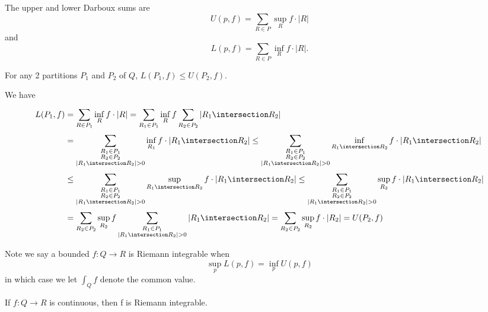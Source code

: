 \vline

\begin{definition}
	The upper and lower Darboux sums are
	\[
		U(p,f) = \sum_{R \in P} \sup_R f \cdot |R|
	\]
	and
	\[
		L(p,f) = \sum_{R \in P} \inf_R f \cdot |R|.
	\]
\end{definition}

\begin{lemma}
	For any 2 partitions $P_1$ and $P_2$ of $Q$, $L(P_1,f) \leq U(P_2, f)$.
\end{lemma}

\begin{solution}
	We have
	\begin{align*}
		L(P_1, f) &= \sum_{R \in P_1}^{}  \inf_{R} f \cdot |R| = \sum_{R_1 \in P_1}^{} \inf_{R} f
		\sum_{R_2 \in P_2}^{} |R_1 \intersection R_2 | \\
				  &= \sum_{\substack{R_1 \in P_1 \\ R_2 \in P_2 \\ |R_1 \intersection R_2 | > 0} }^{} \inf_{R_1} f \cdot |R_1 \intersection R_2 |
				  \leq \sum_{\substack{R_1 \in P_1 \\ R_2 \in P_2 \\ |R_1 \intersection R_2 | > 0} }^{} \inf_{R_1 \intersection R_2} f \cdot |R_1 \intersection R_2 | \\
				  &\leq \sum_{\substack{R_1 \in P_1 \\ R_2 \in P_2 \\ |R_1 \intersection R_2 | > 0} }^{} \sup_{R_1 \intersection R_2} f \cdot |R_1 \intersection R_2 |
				  \leq \sum_{\substack{R_1 \in P_1 \\ R_2 \in P_2 \\ |R_1 \intersection R_2 | > 0} }^{} \sup_{R_2} f \cdot |R_1 \intersection R_2 | \\
				  &= \sum_{R_2 \in P_2}^{} \sup_{R_2} f \sum_{\substack{R_1 \in P_1 \\ |R_1 \intersection R_2 | > 0}}^{} |R_1 \intersection R_2 |  = \sum_{R_2 \in P_2}^{} \sup_{R_2} f \cdot |R_2| = U(P_2, f)
	\end{align*}
\end{solution}


Note we say a bounded $f : Q \to R$ is Riemann integrable when
\[\sup_p L(p,f) = \inf_p U(p,f)\]
in which case we let  $\int_{Q} f$ denote the common value.


\begin{theorem}
	If $f : Q \to R$ is continuous, then f is Riemann integrable.
\end{theorem}


